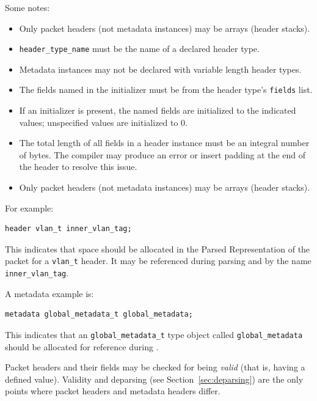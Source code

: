 \documentclass[12pt]{article}
\begin{document}
Some notes:

\begin{itemize}
\item
Only packet headers (not metadata instances) may be arrays (header stacks).
\item
\texttt{header_type_name} must be the name of a declared header type.
\item
Metadata instances may not be declared with variable length header types.
\item
The fields named in the initializer must be from the header type's \texttt{fields} list.
\item
If an initializer is present, the named fields are initialized to the indicated 
values; unspecified values are initialized to 0.
\item
The total length of all fields in a header instance must be an integral number
of bytes. The compiler may produce an error or insert padding at the end of
the header to resolve this issue.
\item
Only packet headers (not metadata instances) may be arrays (header stacks).
\end{itemize}


For example:

\begin{lstlisting}[style=P4style]
header vlan_t inner_vlan_tag;
\end{lstlisting}

This indicates that space should be allocated in the Parsed
Representation of the packet for a \texttt{vlan_t} header. It may be
referenced during parsing and \matchaction by the name
\texttt{inner_vlan_tag}.

A metadata example is:

\begin{lstlisting}[style=P4style]
metadata global_metadata_t global_metadata;
\end{lstlisting}

This indicates that an \texttt{global_metadata_t} type object called
\texttt{global_metadata} should be allocated for reference during
\matchaction.  


Packet headers and their fields may be checked for being
\textit{valid} (that is, having a defined value). Validity and
deparsing (see Section~\ref{sec:deparsing}) are the only points where packet
headers and metadata headers differ.
\end{document}
